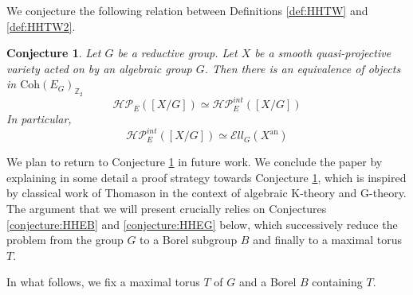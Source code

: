 \documentclass[11pt,letterpaper]{amsart}
\newtheorem{conjecture}[dummy]{Conjecture}
\newcommand{\bZ}{\mathbb{Z}}
\newcommand{\cHP}{\mathcal{HP}}
\newcommand{\El}{\mathcal{E}ll}
\newcommand{\an}{\mathrm{an}}
\newcommand{\Coh}{\mathrm{Coh}}
\begin{document}
We conjecture the following relation between Definitions \ref{def:HHTW} and \ref{def:HHTW2}.

\begin{conjecture}\label{conjecture:HPG}
Let $G$ be a reductive group. Let $X$ be a smooth quasi-projective variety acted on by an algebraic group $G$. Then there is an equivalence of objects in $\Coh(E_G)_{\bZ_2}$
$$\cHP_E([X/G])\simeq\cHP_E^{int}([X/G])$$
In particular,
$$\cHP_E^{int}([X/G])\simeq\El_G(X^\an)$$
\end{conjecture}


We plan to return to Conjecture \ref{conjecture:HPG}  in future work. We conclude the paper by explaining in some detail a proof   strategy towards Conjecture \ref{conjecture:HPG}, which is inspired by classical  work of Thomason in the context of algebraic K-theory and G-theory. The argument that we will present crucially relies on Conjectures \ref{conjecture:HHEB} and \ref{conjecture:HHEG} below, which successively reduce the problem from the group $G$ to a Borel subgroup $B$ and finally to a maximal torus $T$.

In what follows, we fix a maximal torus $T$ of $G$ and a Borel $B$ containing $T$.
\end{document}
